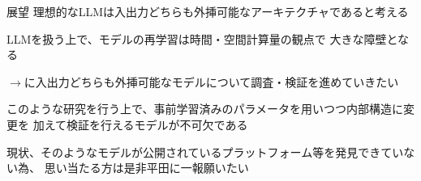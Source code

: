 \documentclass[dvipdfm, aspectratio=169]{beamer}
\begin{document}
    \begin{frame}{展望}
        理想的なLLMは入出力どちらも外挿可能なアーキテクチャであると考える

        LLMを扱う上で、モデルの再学習は時間・空間計算量の観点で
        大きな障壁となる

        $\rightarrow$に入出力どちらも外挿可能なモデルについて調査・検証を進めていきたい

        \begin{exampleblock}{}
            このような研究を行う上で、事前学習済みのパラメータを用いつつ内部構造に変更を
            加えて検証を行えるモデルが不可欠である
            
            \textcolor[rgb]{0,0.5,0}{
                現状、そのようなモデルが公開されているプラットフォーム等を発見できていない為、
                思い当たる方は是非平田に一報願いたい
            }
        \end{exampleblock}
    \end{frame}
\end{document}
